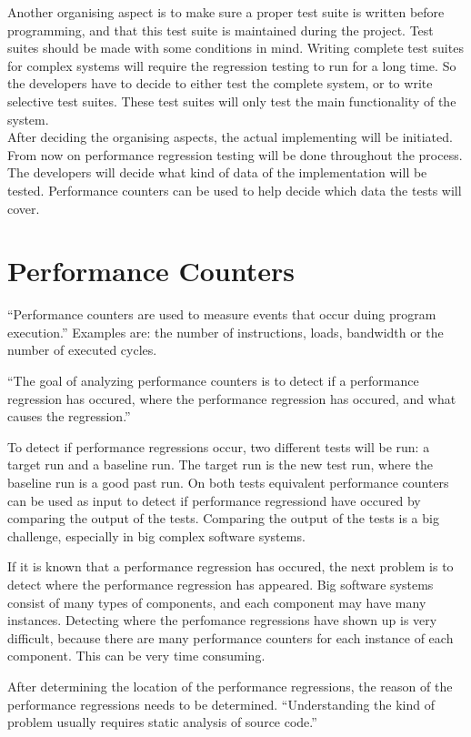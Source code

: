 Another organising aspect is to make sure a proper test suite is written before programming, and that this test suite is maintained during the project. Test suites should be made with some conditions in mind. Writing complete test suites for complex systems will require the regression testing to run for a long time. \cite{rothermel2001prioritizing} So the developers have to decide to either test the complete system, or to write selective test suites. These test suites will only test the main functionality of the system. \\
After deciding the organising aspects, the actual implementing will be initiated. From now on performance regression testing will be done throughout the process. The developers will decide what kind of data of the implementation will be tested. Performance counters can be used to help decide which data the tests will cover.


\section{Performance Counters}``Performance counters are used to measure events that occur duing program execution.''\cite{PC} Examples are: the number of instructions, loads, bandwidth or the number of executed cycles.

``The goal of analyzing performance counters is to detect if a performance regression has occured, where the performance regression has occured, and what causes the regression.'' \cite{nguyen2012using}

To detect if performance regressions occur, two different tests will be run: a target run and a baseline run. The target run is the new test run, where the baseline run is a good past run. On both tests equivalent performance counters can be used as input to detect if performance regressiond have occured by comparing the output of the tests. Comparing the output of the tests is a big challenge, especially in big complex software systems.

If it is known that a performance regression has occured, the next problem is to detect where the performance regression has appeared. Big software systems consist of many types of components, and each component may have many instances. Detecting where the perfomance regressions have shown up is very difficult, because there are many performance counters for each instance of each component. This can be very time consuming.

After determining the location of the performance regressions, the reason of the performance regressions needs to be determined. ``Understanding the kind of problem usually requires static analysis of source code.'' \cite{nguyen2012using}

